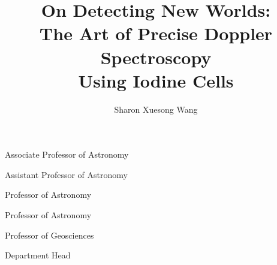 \documentclass[11pt]{psuthesis}
\begin{document}
\title{On Detecting New Worlds: \\
  The Art of Precise Doppler Spectroscopy \\
  Using Iodine Cells}
\author{Sharon Xuesong Wang}


\begin{singlespace}

        {Associate Professor of Astronomy}

          {Assistant Professor of Astronomy}

          {Professor of Astronomy}

            {Professor of Astronomy}

           {Professor of Geosciences}

           {Department Head}

\begin{frontmatter}


\begin{doublespace}

\frontmatter
\psutitlepage
\psucommitteepage
{}
\thesistableofcontents
\thesislistoffigures
\thesislistoftables
\end{doublespace}


\clearpage
{}
\end{frontmatter}

\thesismainmatter
\allowdisplaybreaks{








}


\backmatter



\pagebreak
{}
\end{singlespace}
\end{document}
